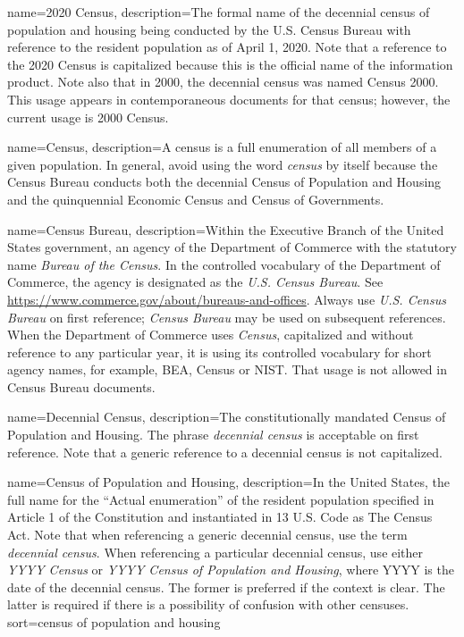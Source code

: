{
    name=2020 Census,
    description={The formal name of the decennial census of population and housing being conducted by the U.S. Census Bureau with reference to the resident population as of April 1, 2020. Note that a reference to the 2020 Census is capitalized because this is the official name of the information product. Note also that in 2000, the decennial census was named Census 2000. This usage appears in contemporaneous documents for that census; however, the current usage is 2000 Census.}
}

{
    name=Census,
    description={A census is a full enumeration of all members of a given population. In general, avoid using the word \textit{census} by itself  because the Census Bureau conducts both the decennial Census of Population and Housing and the quinquennial Economic Census and Census of Governments.}
}

{
    name=Census Bureau,
    description={Within the Executive Branch of the United States government, an agency of the Department of Commerce with the statutory name  \textit{Bureau of the Census}. In the controlled vocabulary of the Department of Commerce, the agency is designated as the \textit{U.S. Census Bureau}. See \url{https://www.commerce.gov/about/bureaus-and-offices}.  Always use \textit{U.S. Census Bureau} on first reference; \emph{Census Bureau} may be used on subsequent references. When the Department of Commerce uses \textit{Census}, capitalized and without reference to any particular year, it is using its controlled vocabulary for short agency names, for example, BEA, Census or NIST. That usage is not allowed in Census Bureau documents.}
}
 
{
    name=Decennial Census,
    description={The constitutionally mandated Census of Population and Housing. The phrase \emph{decennial census} is acceptable on first reference. Note that a generic reference to a decennial census is not capitalized. }
}

{
    name=Census of Population and Housing,
    description={In the United States, the full name for the ``Actual enumeration'' of the resident population specified in Article 1 of the Constitution and instantiated in 13 U.S. Code as The Census Act. Note that when referencing a generic decennial census, use the term \textit{decennial census}. When referencing a particular decennial census, use either \textit{YYYY Census} or \textit{YYYY Census of Population and Housing}, where YYYY is the date of the decennial census. The former is preferred if the context is clear. The latter is required if there is a possibility of confusion with other censuses.}
    sort=census of population and housing
}

